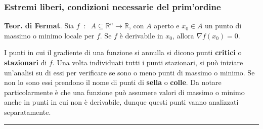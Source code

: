 \subsubsection*{Estremi liberi, condizioni necessarie del prim'ordine}
\textbf{Teor. di Fermat}. Sia $f \;\;:\;\; A \subseteq \mathbb{R}^n \rightarrow \mathbb{R}$, con $A$ aperto e $x_0 \in A$ un punto di massimo o minimo locale per $f$. Se $f$ è derivabile in $x_0$, allora $\nabla f(x_0) = 0$.\newline
\begin{tcolorbox}
    I punti in cui il gradiente di una funzione si annulla si dicono punti \textbf{critici} o \textbf{stazionari} di $f$. Una volta individuati tutti i punti stazionari, si può iniziare un'analisi su di essi per verificare se sono o meno punti di massimo o minimo. Se non lo sono essi prendono il nome di punti di \textbf{sella} o \textbf{colle}. Da notare particolarmente è che una funzione può assumere valori di massimo o minimo anche in punti in cui non è derivabile, dunque questi punti vanno analizzati separatamente.
\end{tcolorbox}
\rule{\textwidth}{0.4pt}
